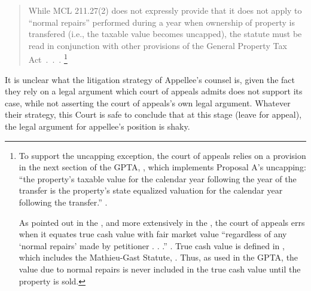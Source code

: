 \documentclass[12pt,\documentclassflag]{michiganCourtOfAppealsBrief}
\begin{document}
\begin{quote}While MCL 211.27(2) does not expressly provide that it does not apply to ``normal repairs'' performed during a year when ownership of property is transfered (i.e., the taxable value becomes uncapped), the statute must be read in conjunction with other provisions of the General Property Tax Act~.~.~.%
\footnote{To support the uncapping exception, the court of appeals relies on a provision in the next section of the GPTA, \cite{MCL 211.27a(3)}, which implements Proposal A's uncapping: ``the property’s taxable value for
the calendar year following the year of the transfer is the property’s state equalized valuation for
the calendar year following the transfer.'' .

As pointed out in the , and more extensively in the , the court of appeals errs when it equates true cash value with fair market value ``regardless of any `normal repairs' made by petitioner . . .'' . True cash value is defined in \cite{MCL 211.27}, which includes the Mathieu-Gast Statute, \mathieuGast. Thus, as used in the GPTA, the value due to normal repairs is never included in the true cash value until the property is sold.}
\end{quote}

It is unclear what the litigation strategy of Appellee's counsel is, given the fact they rely on a legal argument which court of appeals admits does not support its case, while not asserting the court of appeals's own legal argument. Whatever their strategy, this Court is safe to conclude that at this stage (leave for appeal), the legal argument for appellee's position is shaky.


\end{document}
